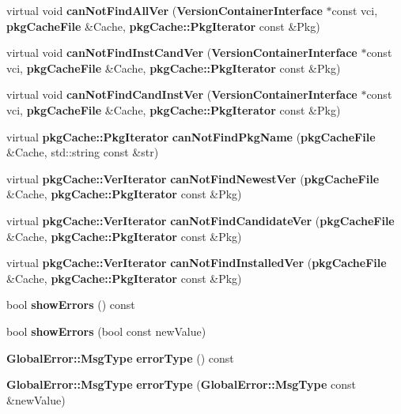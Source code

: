 \begin{DoxyCompactItemize}
\item 
virtual void {\bfseries can\-Not\-Find\-All\-Ver} ({\bf \-Version\-Container\-Interface} $\ast$const vci, {\bf pkg\-Cache\-File} \&\-Cache, {\bf pkg\-Cache\-::\-Pkg\-Iterator} const \&\-Pkg)\label{classAPT_1_1CacheSetHelper_a4ea3067ebab52cd5eded9812a0d85ba8}

\item 
virtual void {\bfseries can\-Not\-Find\-Inst\-Cand\-Ver} ({\bf \-Version\-Container\-Interface} $\ast$const vci, {\bf pkg\-Cache\-File} \&\-Cache, {\bf pkg\-Cache\-::\-Pkg\-Iterator} const \&\-Pkg)\label{classAPT_1_1CacheSetHelper_a6137aeea15fc1f3b23a2540a7ab91160}

\item 
virtual void {\bfseries can\-Not\-Find\-Cand\-Inst\-Ver} ({\bf \-Version\-Container\-Interface} $\ast$const vci, {\bf pkg\-Cache\-File} \&\-Cache, {\bf pkg\-Cache\-::\-Pkg\-Iterator} const \&\-Pkg)\label{classAPT_1_1CacheSetHelper_a93d33933d207a6300e520d600ff2bb8a}

\item 
virtual {\bf pkg\-Cache\-::\-Pkg\-Iterator} {\bfseries can\-Not\-Find\-Pkg\-Name} ({\bf pkg\-Cache\-File} \&\-Cache, std\-::string const \&str)\label{classAPT_1_1CacheSetHelper_ac9f48773f94e547962061b785976726f}

\item 
virtual {\bf pkg\-Cache\-::\-Ver\-Iterator} {\bfseries can\-Not\-Find\-Newest\-Ver} ({\bf pkg\-Cache\-File} \&\-Cache, {\bf pkg\-Cache\-::\-Pkg\-Iterator} const \&\-Pkg)\label{classAPT_1_1CacheSetHelper_a9dc7b1a2dfba561c75aeed6495217ac1}

\item 
virtual {\bf pkg\-Cache\-::\-Ver\-Iterator} {\bfseries can\-Not\-Find\-Candidate\-Ver} ({\bf pkg\-Cache\-File} \&\-Cache, {\bf pkg\-Cache\-::\-Pkg\-Iterator} const \&\-Pkg)\label{classAPT_1_1CacheSetHelper_ab5c6b13308b12b8c9eed683b8fdb7824}

\item 
virtual {\bf pkg\-Cache\-::\-Ver\-Iterator} {\bfseries can\-Not\-Find\-Installed\-Ver} ({\bf pkg\-Cache\-File} \&\-Cache, {\bf pkg\-Cache\-::\-Pkg\-Iterator} const \&\-Pkg)\label{classAPT_1_1CacheSetHelper_a5f398d661df5655a08aaa5e0d0936903}

\item 
bool {\bfseries show\-Errors} () const \label{classAPT_1_1CacheSetHelper_a1881294baa887d4cca7a5b2d72077570}

\item 
bool {\bfseries show\-Errors} (bool const new\-Value)\label{classAPT_1_1CacheSetHelper_af3e4da4882d0fd6437fceb486c3dbf35}

\item 
{\bf \-Global\-Error\-::\-Msg\-Type} {\bfseries error\-Type} () const \label{classAPT_1_1CacheSetHelper_af487be30dcad800b9d21f2c840502ae2}

\item 
{\bf \-Global\-Error\-::\-Msg\-Type} {\bfseries error\-Type} ({\bf \-Global\-Error\-::\-Msg\-Type} const \&new\-Value)\label{classAPT_1_1CacheSetHelper_ad9b98257e25d1bc37b95ef49dcf3dc7f}

\end{DoxyCompactItemize}
